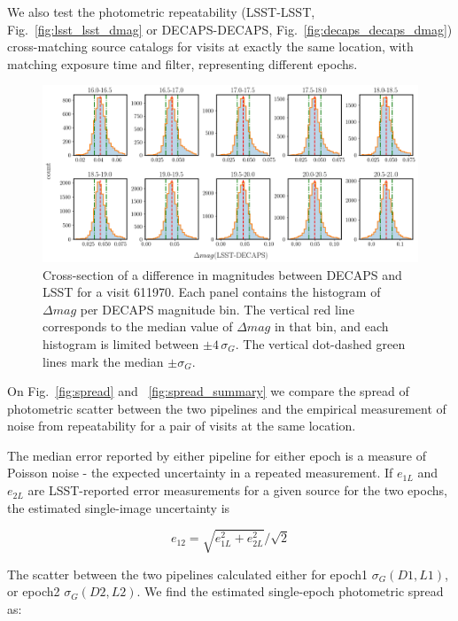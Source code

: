 \documentclass[DM,lsstdraft,toc,usenatbib,authoryear]{lsstdoc}
\begin{document}
We also test the photometric repeatability (LSST-LSST, Fig.~\ref{fig:lsst_lsst_dmag} or DECAPS-DECAPS, Fig.~\ref{fig:decaps_decaps_dmag}) cross-matching  source catalogs for visits at exactly the same location, with matching exposure time and filter, representing different epochs.


\begin{figure}
\begin{centering}
\includegraphics[width=1.1\columnwidth]{figs/rms_decaps_lsst_611970hist_panel.png}
\caption{Cross-section of a difference in magnitudes between DECAPS and LSST for a visit 611970. Each panel contains the histogram of $\Delta mag$ per DECAPS magnitude bin. The vertical red line corresponds to the median value of $\Delta mag$ in that bin, and each histogram is limited between $\pm 4 \, \sigma_{G}$. The vertical dot-dashed green lines mark the median $\pm \sigma_{G}$. }
\label{fig:dmag_hist}
\end{centering}
\end{figure}


On Fig.~\ref{fig:spread} and ~\ref{fig:spread_summary} we compare the spread of photometric scatter between the two pipelines and  the empirical measurement of noise from repeatability for a pair of visits at the same location.

The median error reported by either pipeline for either epoch is a measure of Poisson noise - the expected uncertainty in a repeated measurement.  If $e_{1L}$ and $e_{2L}$ are LSST-reported error measurements for a given source for the two epochs,  the estimated single-image uncertainty is

\begin{equation}
\label{eq:error}
e_{12} = \sqrt{e_{1L}^{2} + e_{2L}^{2}} / \sqrt{2}
\end{equation}


The scatter between the two pipelines calculated either for epoch1  $\sigma_{G}(D1,L1)$, or epoch2 $\sigma_{G}(D2,L2)$. We find the estimated single-epoch photometric spread as:
\end{document}
